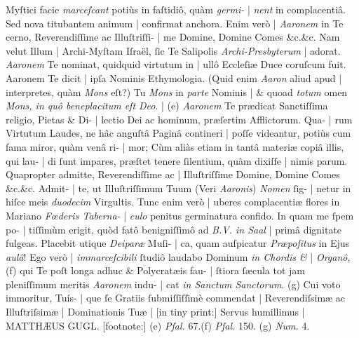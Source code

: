 \documentclass[abbrwidth=7em,shorttitlesize=55]{ees}
\begin{document}
\begin{flushleft}
\begin{description}[labelwidth=3em,leftmargin=3.5em]
  \item[fol. 3r] Myſtici facie \textit{marceſcant} potiùs in faſtidiô, quàm \textit{germi-} | \textit{nent} in complacentiâ. Sed nova titubantem animum | confirmat anchora. Enim verò | \textit{Aaronem} in Te cerno, Reverendiſſime ac Illuſtriſſi- | me Domine, Domine Comes \&c.\&c. Nam velut Illum | Archi-Myſtam Iſraël, ſic Te Salipolis \textit{Archi-Presbyterum} | adorat. \textit{Aaronem} Te nominat, quidquid virtutum in | ullô Eccleſiæ Duce coruſcum fuit. Aaronem Te dicit | ipſa Nominis Ethymologia. (Quid enim \textit{Aaron} aliud apud | interpretes, quàm \textit{Mons} eſt?) Tu \textit{Mons} in \textit{parte} Nominis | \& quoad \textit{totum} omen \textit{Mons, in quô beneplacitum eſt Deo}. | (e) \textit{Aaronem} Te prædicat Sanctiſſima religio, Pietas \& Di- | lectio Dei ac hominum, præſertim Afflictorum. Qua- | rum Virtutum Laudes, ne hâc anguſtâ Paginâ contineri | poſſe videantur, potiùs cum fama miror, quàm venâ ri- | mor; Cùm aliàs etiam in tantâ materiæ copiâ illis, qui lau- | di ſunt impares, præſtet tenere ſilentium, quàm dixiſſe | nimis parum. Quapropter admitte, Reverendiſſime ac | Illuſtriſſime Domine, Domine Comes \&c.\&c. Admit- | te, ut Illuſtriſſimum Tuum (Veri \textit{Aaronis}) \textit{Nomen} ſig- | netur in hiſce meis \textit{duodecim} Virgultis. Tunc enim verò | uberes complacentiæ flores in Mariano \textit{Fœderis Taberna-} | \textit{culo} penitus germinatura confido. In quam me ſpem po- | tiſſimùm erigit, quòd fatô benigniſſimô ad \textit{B.V. in Saal} | primâ dignitate fulgeas. Placebit utique \textit{Deiparæ} Muſi- | ca, quam auſpicatur \textit{Præpoſitus} in Ejus \textit{aulâ}! Ego verò | \textit{immarceſcibili} ſtudiô laudabo Dominum \textit{in Chordis \&} | \textit{Organô}, (f) qui Te poſt longa adhuc \& Polycratæis fau- | ſtiora ſæcula tot jam pleniſſimum meritis \textit{Aaronem} indu- | cat \textit{in Sanctum Sanctorum}. (g) Cui voto immoritur, Tuís- | que ſe Gratiis ſubmiſſiſſimè commendat | Reverendiſsimæ ac Illuſtriſsimæ | Dominationis Tuæ | [in tiny print:] Servus humillimus | MATTHÆUS GUGL. [footnote:] (e) \textit{Pſal.} 67.(f) \textit{Pſal.} 150. (g) \textit{Num.} 4.

\end{description}
\end{flushleft}
\end{document}

